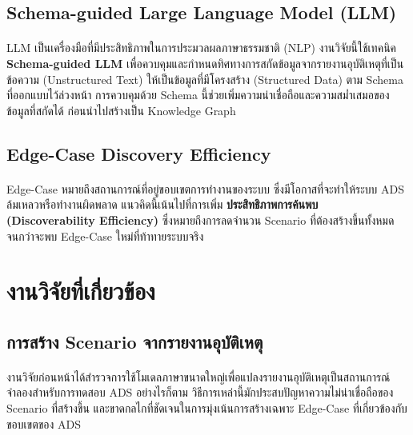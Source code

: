\subsection{Schema-guided Large Language Model (LLM)}\paragraph{}

LLM เป็นเครื่องมือที่มีประสิทธิภาพในการประมวลผลภาษาธรรมชาติ (NLP) งานวิจัยนี้ใช้เทคนิค \textbf{Schema-guided LLM} เพื่อควบคุมและกำหนดทิศทางการสกัดข้อมูลจากรายงานอุบัติเหตุที่เป็นข้อความ (Unstructured Text) ให้เป็นข้อมูลที่มีโครงสร้าง (Structured Data) ตาม Schema ที่ออกแบบไว้ล่วงหน้า การควบคุมด้วย Schema นี้ช่วยเพิ่มความน่าเชื่อถือและความสม่ำเสมอของข้อมูลที่สกัดได้ ก่อนนำไปสร้างเป็น Knowledge Graph

\subsection{Edge-Case Discovery Efficiency}\paragraph{}

Edge-Case หมายถึงสถานการณ์ที่อยู่ขอบเขตการทำงานของระบบ ซึ่งมีโอกาสที่จะทำให้ระบบ ADS ล้มเหลวหรือทำงานผิดพลาด แนวคิดนี้เน้นไปที่การเพิ่ม \textbf{ประสิทธิภาพการค้นพบ (Discoverability Efficiency)} ซึ่งหมายถึงการลดจำนวน Scenario ที่ต้องสร้างขึ้นทั้งหมดจนกว่าจะพบ Edge-Case ใหม่ที่ท้าทายระบบจริง

\section{งานวิจัยที่เกี่ยวข้อง}

\subsection{การสร้าง Scenario จากรายงานอุบัติเหตุ}\paragraph{}

งานวิจัยก่อนหน้าได้สำรวจการใช้โมเดลภาษาขนาดใหญ่เพื่อแปลงรายงานอุบัติเหตุเป็นสถานการณ์จำลองสำหรับการทดสอบ ADS \cite{khot2024prompting} อย่างไรก็ตาม วิธีการเหล่านี้มักประสบปัญหาความไม่น่าเชื่อถือของ Scenario ที่สร้างขึ้น และขาดกลไกที่ชัดเจนในการมุ่งเน้นการสร้างเฉพาะ Edge-Case ที่เกี่ยวข้องกับขอบเขตของ ADS

